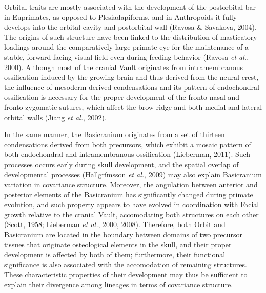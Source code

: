 \documentclass[12pt,twoside]{report}
\begin{document}
Orbital traits are mostly associated with the development of the
postorbital bar in Euprimates, as opposed to Plesiadapiforms, and in
Anthropoids it fully develops into the orbital cavity and postorbital
wall (Ravosa \& Savakova, 2004). The origins of such structure have been
linked to the distribution of masticatory loadings around the
comparatively large primate eye for the maintenance of a stable,
forward-facing visual field even during feeding behavior (Ravosa
\emph{et al.}, 2000). Although most of the cranial Vault originates from
intramembranous ossification induced by the growing brain and thus
derived from the neural crest, the influence of mesoderm-derived
condensations and its pattern of endochondral ossification is necessary
for the proper development of the fronto-nasal and fronto-zygomatic
sutures, which affect the brow ridge and both medial and lateral orbital
walls (Jiang \emph{et al.}, 2002).

In the same manner, the Basicranium originates from a set of thirteen
condensations derived from both precursors, which exhibit a mosaic
pattern of both endochondral and intramembranous ossification
(Lieberman, 2011). Such processes occurs early during skull development,
and the spatial overlap of developmental processes (Hallgrímsson
\emph{et al.}, 2009) may also explain Basicranium variation in
covariance structure. Moreover, the angulation between anterior and
posterior elements of the Basicranium has significantly changed during
primate evolution, and such property appears to have evolved in
coordination with Facial growth relative to the cranial Vault,
accomodating both structures on each other (Scott, 1958; Lieberman
\emph{et al.}, 2000, 2008). Therefore, both Orbit and Basicranium are
located in the boundary between domains of two precursor tissues that
originate osteological elements in the skull, and their proper
development is affected by both of them; furthermore, their functional
significance is also associated with the accomodation of remaining
structures. These characteristic properties of their development may
thus be sufficient to explain their divergence among lineages in terms
of covariance structure.
\end{document}
